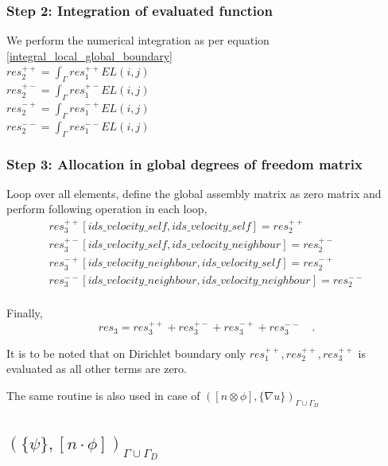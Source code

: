 \documentclass[a4paper]{book}
\begin{document}
\subsubsection{Step 2: Integration of evaluated function}

We perform the numerical integration as per equation \ref{integral_local_global_boundary}
\\ 
$res_2^{++} = \int_{\Gamma} res_1^{++} EL(i,j)$\\
$res_2^{+-} = \int_{\Gamma} res_1^{+-} EL(i,j)$\\
$res_2^{-+} = \int_{\Gamma} res_1^{-+} EL(i,j)$\\
$res_2^{--} = \int_{\Gamma} res_1^{--} EL(i,j)$\\

\subsubsection{Step 3: Allocation in global degrees of freedom matrix}

Loop over all elements, define the global assembly matrix as zero matrix and perform following operation in each loop,
\begin{equation}
\begin{split}
res_3^{++}[ids\_velocity\_self,ids\_velocity\_self] = res_2^{++}\\
res_3^{+-}[ids\_velocity\_self,ids\_velocity\_neighbour] = res_2^{+-}\\
res_3^{-+}[ids\_velocity\_neighbour,ids\_velocity\_self] = res_2^{-+}\\
res_3^{--}[ids\_velocity\_neighbour,ids\_velocity\_neighbour] = res_2^{--}\\
\end{split}
\end{equation}

Finally,
\begin{equation}
res_3 = res_3^{++} + res_3^{+-} + res_3^{-+} + res_3^{--} \quad \textrm{.}
\end{equation}

It is to be noted that on Dirichlet boundary only $res_1^{++}, res_2^{++}, res_3^{++}$ is evaluated as all other terms are zero.

The same routine is also used in case of $([n \otimes \phi],\lbrace \nabla u \rbrace )_{\Gamma \cup \Gamma_D}$

\subsection{$(\lbrace \psi \rbrace, [n \cdot \phi])_{\Gamma \cup \Gamma_D}$}
\end{document}

